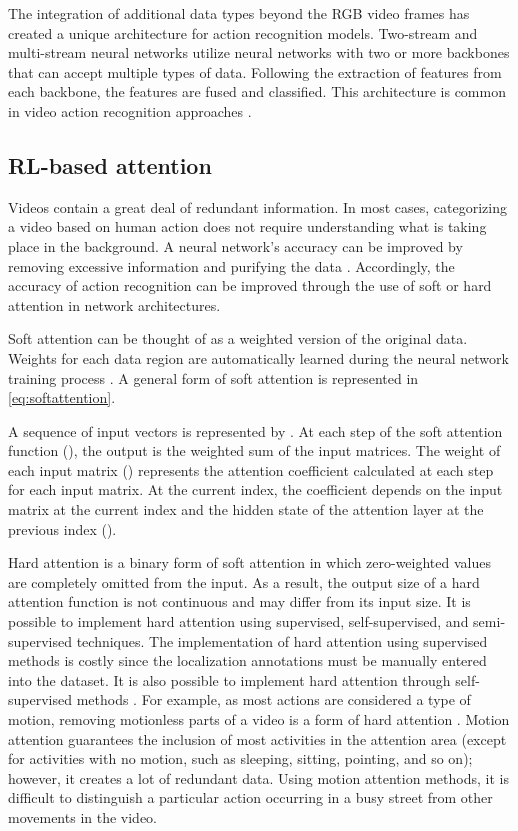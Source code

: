 \documentclass[review]{elsarticle}
\begin{document}
The integration of additional data types beyond the RGB video frames has created a unique architecture for action recognition models. Two-stream and multi-stream neural networks utilize neural networks with two or more backbones that can accept multiple types of data. Following the extraction of features from each backbone, the features are fused and classified. This architecture is common in video action recognition approaches \citep{simonyan2014two, tu2018multi, shi2020skeleton, wang2021multi}.

\subsection{RL-based attention}

Videos contain a great deal of redundant information. In most cases, categorizing a video based on human action does not require understanding what is taking place in the background. A neural network's accuracy can be improved by removing excessive information and purifying the data \citep{song2022learning}. Accordingly, the accuracy of action recognition can be improved through the use of soft or hard attention in network architectures.

Soft attention can be thought of as a weighted version of the original data. Weights for each data region are automatically learned during the neural network training process \citep{sharma2015action, liu2017global, song2017end, li2020spatio}. A general form of soft attention is represented in \autoref{eq:softattention}.



{A sequence of input vectors is represented by . At each step of the soft attention function (), the output is the weighted sum of the input matrices. The weight of each input matrix () represents the attention coefficient calculated at each step for each input matrix. At the current index, the coefficient depends on the input matrix at the current index and the hidden state of the attention layer at the previous index ().}

Hard attention is a binary form of soft attention in which zero-weighted values are completely omitted from the input. As a result, the output size of a hard attention function is not continuous and may differ from its input size. It is possible to implement hard attention using supervised, self-supervised, and semi-supervised techniques. The implementation of hard attention using supervised methods is costly since the localization annotations must be manually entered into the dataset. It is also possible to implement hard attention through self-supervised methods \citep{manchin2019reinforcement}. For example, as most actions are considered a type of motion, removing motionless parts of a video is a form of hard attention \citep{crasto2019mars}. Motion attention guarantees the inclusion of most activities in the attention area (except for activities with no motion, such as sleeping, sitting, pointing, and so on); however, it creates a lot of redundant data. Using motion attention methods, it is difficult to distinguish a particular action occurring in a busy street from other movements in the video.
\end{document}
